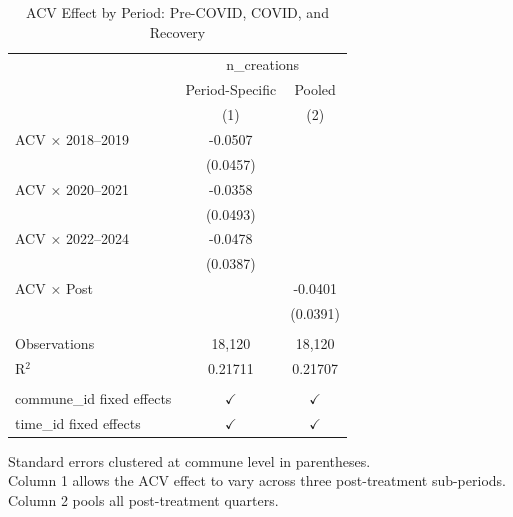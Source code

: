 
\begin{table}[htbp]
   \caption{\label{tab:periods} ACV Effect by Period: Pre-COVID, COVID, and Recovery}
   \bigskip
   \centering
   \begin{tabular}{lcc}
      \toprule
       & \multicolumn{2}{c}{n\_creations}\\
                                 & Period-Specific & Pooled \\   
                                 & (1)             & (2)\\  
      \midrule 
      ACV × 2018--2019           & -0.0507         &   \\   
                                 & (0.0457)        &   \\   
      ACV × 2020--2021           & -0.0358         &   \\   
                                 & (0.0493)        &   \\   
      ACV × 2022--2024           & -0.0478         &   \\   
                                 & (0.0387)        &   \\   
      ACV × Post                 &                 & -0.0401\\   
                                 &                 & (0.0391)\\   
       \\
      Observations               & 18,120          & 18,120\\  
      R$^2$                      & 0.21711         & 0.21707\\  
       \\
      commune\_id fixed effects  & $\checkmark$    & $\checkmark$\\   
      time\_id fixed effects     & $\checkmark$    & $\checkmark$\\   
      \bottomrule
   \end{tabular}
   
   \par \raggedright 
   Standard errors clustered at commune level in parentheses.\\
   Column 1 allows the ACV effect to vary across three post-treatment sub-periods.\\
   Column 2 pools all post-treatment quarters.
\end{table}


